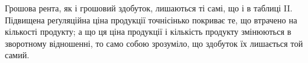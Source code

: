 Грошова рента, як і грошовий здобуток, лишаються ті самі, що і в таблиці II.
Підвищена реґуляційна ціна продукції точнісінько покриває те, що втрачено
на кількості продукту; а що ця ціна продукції і кількість продукту змінюються
в зворотному відношенні, то само собою зрозуміло, що здобуток їх лишається
той самий.
